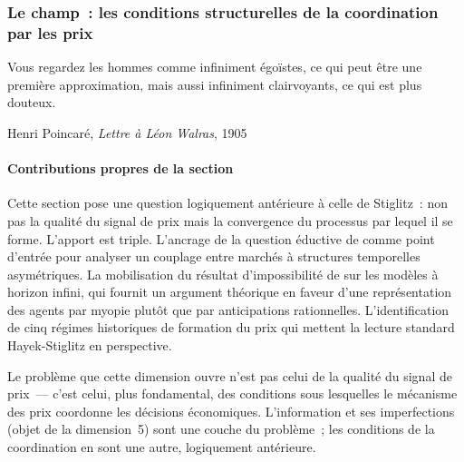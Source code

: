 \subsubsection{Le champ~: les conditions structurelles de la coordination par les prix}

\epigraph{Vous regardez les hommes comme infiniment égoïstes, ce qui peut être une première approximation, mais aussi infiniment clairvoyants, ce qui est plus douteux.}{Henri Poincaré, \emph{Lettre à Léon Walras}, 1905\footnotemark}

\paragraph{Contributions propres de la section}
Cette section pose une question logiquement antérieure à celle de Stiglitz~: non pas la qualité du signal de prix mais la convergence du processus par lequel il se forme. L'apport est triple. L'ancrage de la question éductive de \textcite{guesnerie_eductive_1992} comme point d'entrée pour analyser un couplage entre marchés à structures temporelles asymétriques. La mobilisation du résultat d'impossibilité de \textcite{evans_guesnerie_mcgough_2019} sur les modèles à horizon infini, qui fournit un argument théorique en faveur d'une représentation des agents par myopie plutôt que par anticipations rationnelles. L'identification de cinq régimes historiques de formation du prix qui mettent la lecture standard Hayek-Stiglitz en perspective.




Le problème que cette dimension ouvre n'est pas celui de la qualité du signal de prix~--- c'est celui, plus fondamental, des conditions sous lesquelles le mécanisme des prix coordonne les décisions économiques. L'information et ses imperfections (objet de la dimension~5) sont une couche du problème~; les conditions de la coordination en sont une autre, logiquement antérieure.

